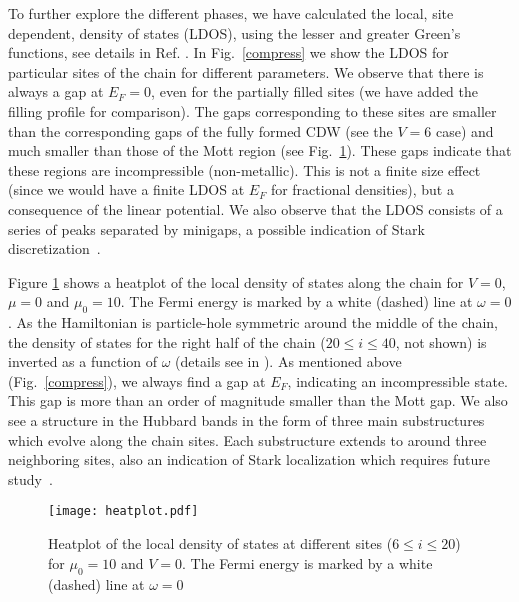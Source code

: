 \documentclass[aps,prl,showpacs,twocolumn,superscriptaddress]{revtex4-2}
\begin{document}

\vspace{0.2cm}

 To further explore  the different phases, we have calculated the local, site dependent, density of states (LDOS), using  the lesser and greater Green's functions, see details in Ref. \cite{SM}. In Fig.~\ref{compress} we show the LDOS for particular sites of the chain for different parameters. We observe that there is always a gap at $E^{}_F=0$, even for the partially filled sites (we have added the filling profile for comparison). The gaps corresponding to these sites are smaller than the corresponding gaps of the fully formed CDW (see the $V=6$ case) and much smaller than those of the Mott region (see Fig.~\ref{dosV0}).  These gaps indicate that these regions are incompressible (non-metallic). This is not a finite size effect (since we would have a finite LDOS at $E^{}_F$ for fractional densities), but a consequence of the linear potential.
We also observe that the LDOS consists of a series of peaks separated by minigaps, a possible indication of Stark discretization~\cite{stark}.


Figure \ref{dosV0} shows a heatplot of the local density of states  along the chain for $V=0$, $\mu=0$ and $\mu^{}_0=10$. The Fermi energy is marked by a white (dashed) line at $\omega=0$.
As the Hamiltonian is particle-hole symmetric around the middle of the chain, the density of states  for the right half of the chain ($20\leq i \leq 40$, not shown) is inverted as a function of $\omega$    (details see in \cite{SM}).
 As mentioned above (Fig.~\ref{compress}), we always find a gap at $E^{}_F$, indicating an incompressible state. This gap is more than an order of magnitude smaller than the Mott gap. We also see a structure in the Hubbard bands in the form of three main substructures which evolve along the chain sites. Each substructure extends to around three neighboring sites, also an indication of Stark localization which requires future study~\cite{stark}.



\begin{figure}[h!]
\centering
\texttt{[image: heatplot.pdf]}
\caption{Heatplot of the local density of states at different sites ($6\leq i \leq 20$) for $\mu^{}_0=10$ and $V=0$. The Fermi energy is marked by a white (dashed) line at $\omega=0$}
\label{dosV0}
\end{figure}
\end{document}
